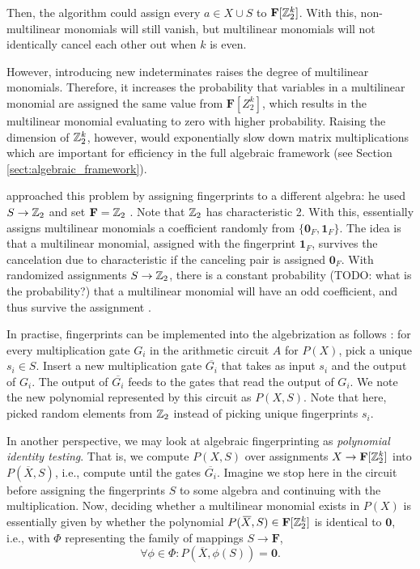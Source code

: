 Then, the algorithm could assign every $a \in X \cup S$ to $\mathbf{F}[\mathbb Z_2^k]$. 
With this, non-multilinear monomials will still vanish, but multilinear monomials 
will not identically cancel each other out when $k$ is even. 

However, introducing new indeterminates raises the degree of multilinear monomials. 
Therefore, it increases the probability that variables in a multilinear monomial are 
assigned the same value from $\mathbf{F}[Z_2^k]$, which results in the 
multilinear monomial evaluating to zero with higher probability. 
Raising the dimension of $\mathbb Z_2^k$, however, would  
exponentially slow down matrix multiplications which are %
important for efficiency in the full algebraic framework (see Section \ref{sect:algebraic_framework}).

\citeauthor{Koutis08} approached this problem by assigning fingerprints to a 
different algebra: he used $S \to \mathbb Z_2$ and set 
$\mathbf{F} = \mathbb Z_2$ \cite{Koutis08}. Note that $\mathbb Z_2$ has characteristic 2. With this, 
\citeauthor{Koutis08} essentially assigns multilinear monomials a coefficient 
randomly from $\{\mathbf{0}_F, \mathbf{1}_F\}$. The idea is that a multilinear monomial, 
assigned with the fingerprint $\mathbf{1}_F$,  
survives the cancelation due to characteristic if the canceling pair is assigned $\mathbf{0}_F$. 
With randomized assignments $S \to \mathbb Z_2$, there is a constant probability 
(TODO: what is the probability?) that a multilinear 
monomial will have an odd coefficient, and thus survive the assignment \cite{Koutis08}.

In practise, fingerprints can be implemented into the algebrization as follows \cite{Williams09}: 
for every multiplication gate $G_i$ in the arithmetic circuit $A$ for $P(X)$, 
pick a unique $s_i \in S$. Insert a new multiplication gate $\overbar{G_i}$ that takes 
as input $s_i$ and the output of $G_i$. The output of $\overbar{G_i}$ feeds to the 
gates that read the output of $G_i$. We note the new polynomial represented by this circuit 
as $P(X, S)$. Note that here, 
\citeauthor{Koutis08} picked random elements from $\mathbb Z_2$ 
instead of picking unique fingerprints $s_i$.

In another perspective, we may look at algebraic fingerprinting as \emph{polynomial identity testing}. 
That is, we compute $P(X, S)$ over assignments $X \to \mathbf{F}[\mathbb Z_2^k]$ into $P(\overbar{X}, S)$, i.e., 
compute until the gates $\overbar{G_i}$. 
Imagine we stop here in the circuit before assigning the fingerprints $S$ to some algebra 
and continuing with the multiplication. 
Now, deciding whether a multilinear monomial exists in $P(X)$ is essentially given by 
whether the polynomial $P(\,\overline{\!{X}}, S) \in \mathbf{F}[\mathbb Z_2^k]$ is identical to $\mathbf{0}$, 
i.e., with $\Phi$ representing the family of mappings $S \to \mathbf{F}$, 
\[
  \forall \phi \in \Phi %
  \colon P(\overbar{X}, \phi(S)) = \mathbf{0}.
\]

